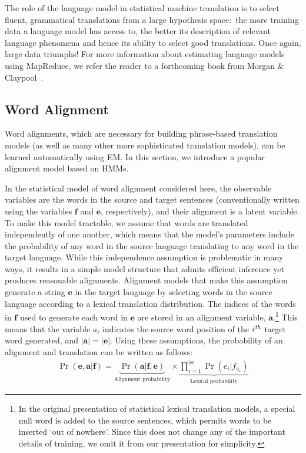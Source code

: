 The role of the language model in statistical machine translation is
to select fluent, grammatical translations from a large hypothesis
space:\ the more training data a language model has access to, the
better its description of relevant language phenomena and hence its
ability to select good translations.  Once again, large data triumphs!
For more information about estimating language models using MapReduce,
we refer the reader to a forthcoming book from Morgan \&
Claypool~\cite{Brants_2010}.

\subsection{Word Alignment}

Word alignments, which are necessary for building phrase-based
translation models (as well as many other more sophisticated
translation models), can be learned automatically using EM.  In this
section, we introduce a popular alignment model based on HMMs.

In the statistical model of word alignment considered here, the
observable variables are the words in the source and target sentences
(conventionally written using the variables $\textbf{f}$ and
$\textbf{e}$, respectively), and their alignment is a latent variable.
To make this model tractable, we assume that words are translated
independently of one another, which means that the model's parameters
include the probability of any word in the source language translating
to any word in the target language.  While this independence
assumption is problematic in many ways, it results in a simple model
structure that admits efficient inference yet produces reasonable
alignments.  Alignment models that make this assumption generate a
string $\textbf{e}$ in the target language by selecting words in the
source language according to a lexical translation distribution.  The
indices of the words in $\textbf{f}$ used to generate each word in
$\textbf{e}$ are stored in an alignment variable,
$\textbf{a}$.\footnote{In the original presentation of statistical
  lexical translation models, a special null word is added to the
  source sentences, which permits words to be inserted `out of
  nowhere'.  Since this does not change any of the important details
  of training, we omit it from our presentation for simplicity.} This
means that the variable $a_i$ indicates the source word position of
the $i^{\textrm{\emph{th}}}$ target word generated, and $|\textbf{a}|
= |\textbf{e}|$.  Using these assumptions, the probability of an
alignment and translation can be written as follows:
\begin{align}
\Pr(\textbf{e}, \textbf{a} | \textbf{f}) =  \underbrace{  \Pr(\textbf{a} | \textbf{f} , \textbf{e}) }_{\textrm{Alignment probability}} \times  \underbrace{ \prod_{i=1}^{|\textbf{e}|} \Pr(e_i|f_{a_i}) }_{\textrm{Lexical probability}}
\end{align}

